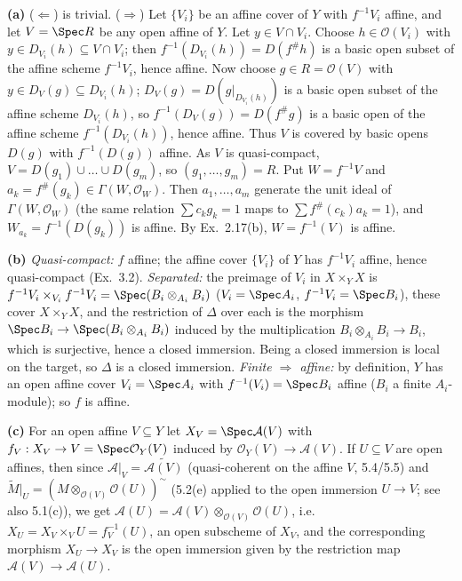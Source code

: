 \documentclass[11pt]{article}
\begin{document}
\textbf{(a)} ($\Leftarrow$) is trivial. ($\Rightarrow$) Let $\{V_i\}$ be an affine cover of $Y$ with $f^{-1}V_i$ affine, and let $V=\Spec R$ be any open affine of $Y$. Let $y\in V\cap V_i$. Choose $h\in\mathcal O(V_i)$ with $y\in D_{V_i}(h)\subseteq V\cap V_i$; then $f^{-1}(D_{V_i}(h))=D(f^\#h)$ is a basic open subset of the affine scheme $f^{-1}V_i$, hence affine. Now choose $g\in R=\mathcal O(V)$ with $y\in D_V(g)\subseteq D_{V_i}(h)$; $D_V(g)=D(g|_{D_{V_i}(h)})$ is a basic open subset of the affine scheme $D_{V_i}(h)$, so $f^{-1}(D_V(g))=D(f^\#g)$ is a basic open of the affine scheme $f^{-1}(D_{V_i}(h))$, hence affine. Thus $V$ is covered by basic opens $D(g)$ with $f^{-1}(D(g))$ affine. As $V$ is quasi-compact, $V=D(g_1)\cup\dots\cup D(g_m)$, so $(g_1,\dots,g_m)=R$. Put $W=f^{-1}V$ and $a_k=f^\#(g_k)\in\Gamma(W,\mathcal O_W)$. Then $a_1,\dots,a_m$ generate the unit ideal of $\Gamma(W,\mathcal O_W)$ (the same relation $\sum c_kg_k=1$ maps to $\sum f^\#(c_k)a_k=1$), and $W_{a_k}=f^{-1}(D(g_k))$ is affine. By Ex.\ 2.17(b), $W=f^{-1}(V)$ is affine.

\textbf{(b)} \emph{Quasi-compact:} $f$ affine; the affine cover $\{V_i\}$ of $Y$ has $f^{-1}V_i$ affine, hence quasi-compact (Ex.\ 3.2). \emph{Separated:} the preimage of $V_i$ in $X\times_YX$ is $f^{-1}V_i\times_{V_i}f^{-1}V_i=\Spec(B_i\otimes_{A_i}B_i)$ ($V_i=\Spec A_i$, $f^{-1}V_i=\Spec B_i$), these cover $X\times_YX$, and the restriction of $\Delta$ over each is the morphism $\Spec B_i\to\Spec(B_i\otimes_{A_i}B_i)$ induced by the multiplication $B_i\otimes_{A_i}B_i\to B_i$, which is surjective, hence a closed immersion. Being a closed immersion is local on the target, so $\Delta$ is a closed immersion. \emph{Finite $\Rightarrow$ affine:} by definition, $Y$ has an open affine cover $V_i=\Spec A_i$ with $f^{-1}(V_i)=\Spec B_i$ affine ($B_i$ a finite $A_i$-module); so $f$ is affine.

\textbf{(c)} For an open affine $V\subseteq Y$ let $X_V=\Spec\mathcal A(V)$ with $f_V:X_V\to V=\Spec\mathcal O_Y(V)$ induced by $\mathcal O_Y(V)\to\mathcal A(V)$. If $U\subseteq V$ are open affines, then since $\mathcal A|_V=\widetilde{\mathcal A(V)}$ (quasi-coherent on the affine $V$, 5.4/5.5) and $\widetilde M|_U=(M\otimes_{\mathcal O(V)}\mathcal O(U))^\sim$ (5.2(e) applied to the open immersion $U\to V$; see also 5.1(c)), we get $\mathcal A(U)=\mathcal A(V)\otimes_{\mathcal O(V)}\mathcal O(U)$, i.e.\ $X_U=X_V\times_VU=f_V^{-1}(U)$, an open subscheme of $X_V$, and the corresponding morphism $X_U\to X_V$ is the open immersion given by the restriction map $\mathcal A(V)\to\mathcal A(U)$.
\end{document}
